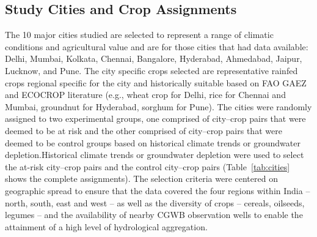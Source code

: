\documentclass{ieeeaccess}
\begin{document}
\subsection{Study Cities and Crop Assignments}
The 10 major cities studied are selected to represent a range of climatic conditions and agricultural value and are for those cities that had data available: Delhi, Mumbai, Kolkata, Chennai, Bangalore, Hyderabad, Ahmedabad, Jaipur, Lucknow, and Pune. The city specific crops selected are representative rainfed crops regional specific for the city and historically suitable based on FAO GAEZ and ECOCROP literature (e.g., wheat crop for Delhi, rice for Chennai and Mumbai, groundnut for Hyderabad, sorghum for Pune). The cities were randomly assigned to two experimental groups, one comprised of city--crop pairs that were deemed to be at risk and the other comprised of city--crop pairs that were deemed to be control groups based on historical climate trends or groundwater depletion.Historical climate trends or groundwater depletion were used to select the at-risk city--crop pairs and the control city--crop pairs (Table~\ref{tab:cities} shows the complete assignments). The selection criteria were centered on geographic spread to ensure that the data covered the four regions within India – north, south, east and west – as well as the diversity of crops – cereals, oilseeds, legumes – and the availability of nearby CGWB observation wells to enable the attainment of a high level of hydrological aggregation.
\end{document}
